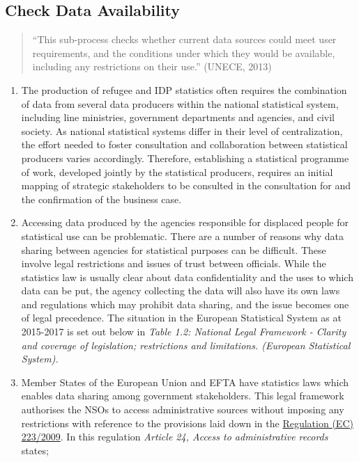 \documentclass[
]{article}
\begin{document}
\hypertarget{check-data-availability}{%
\subsection{Check Data Availability}\label{check-data-availability}}

\begin{quote}
``This sub-process checks whether current data sources could meet user
requirements, and the conditions under which they would be available,
including any restrictions on their use.'' (UNECE, 2013)
\end{quote}

\begin{enumerate}
\def\labelenumi{\arabic{enumi}.}
\setcounter{enumi}{52}
\item
  The production of refugee and IDP statistics often requires the
  combination of data from several data producers within the national
  statistical system, including line ministries, government
  departments and agencies, and civil society. As national statistical
  systems differ in their level of centralization, the effort needed
  to foster consultation and collaboration between statistical
  producers varies accordingly. Therefore, establishing a statistical
  programme of work, developed jointly by the statistical producers,
  requires an initial mapping of strategic stakeholders to be
  consulted in the consultation for and the confirmation of the
  business case.
\item
  Accessing data produced by the agencies responsible for displaced
  people for statistical use can be problematic. There are a number of
  reasons why data sharing between agencies for statistical purposes
  can be difficult. These involve legal restrictions and issues of
  trust between officials. While the statistics law is usually clear
  about data confidentiality and the uses to which data can be put,
  the agency collecting the data will also have its own laws and
  regulations which may prohibit data sharing, and the issue becomes
  one of legal precedence. The situation in the European Statistical
  System as at 2015-2017 is set out below in \emph{Table 1.2: National
  Legal Framework - Clarity and coverage of legislation; restrictions
  and limitations. (European Statistical System).}
\item
  Member States of the European Union and EFTA have statistics laws
  which enables data sharing among government stakeholders. This legal
  framework authorises the NSOs to access administrative sources
  without imposing any restrictions with reference to the provisions
  laid down in the \href{https://eur-lex.europa.eu/LexUriServ/LexUriServ.do?uri=OJ:L:2009:087:0164:0173:En:PDF}{Regulation (EC)
  223/2009}.
  In this regulation \emph{Article 24, Access to administrative records}
  states;


\end{enumerate}
\end{document}
